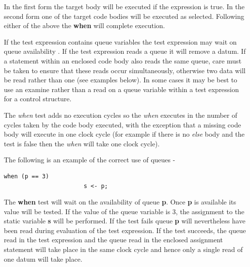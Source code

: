             In the first form the target body will be executed if the
            expression is true. In the second form one of the target code
            bodies will be executed as selected. Following either of the above
            the {\bf when} will complete execution.

            If the test expression contains queue variables the test expression
            may wait on queue availability . If the test
            expression reads a queue it will remove a datum. If a statement
            within an enclosed code body also reads the same queue, care must be
            taken to ensure that these reads occur simultaneously, otherwise two
            data will be read rather than one (see examples below). In some
            cases it may be best to use an examine rather than a read on a queue
            variable within a test expression for a control structure.
            
            The {\em when} test adds no execution cycles so the {\em when}
            executes in the number of cycles taken by the code body executed,
            with the exception that a missing code body will execute in one
            clock cycle (for example if there is no {\em else} body and the
            test is false then the {\em when} will take one clock cycle).
            
            The following is an example of the correct use of queues -
            \begin{lstlisting}[gobble=12, language=threepl]
                   when (p == 3)
                       s <- p;
            \end{lstlisting}
            The {\bf when} test will wait on the availability of queue {\bf p}.
            Once {\bf p} is available its value will be tested. If the value
            of the queue variable is 3, the assignment to the static variable
            {\bf s} will be performed. If the test fails queue {\bf p} will
            nevertheless have been read during evaluation of the test 
            expression. If the test succeeds, the queue read in the test
            expression and the queue read in the enclosed assignment statement
            will take place in the same clock cycle and hence only a single read
            of one datum will take place.
            
